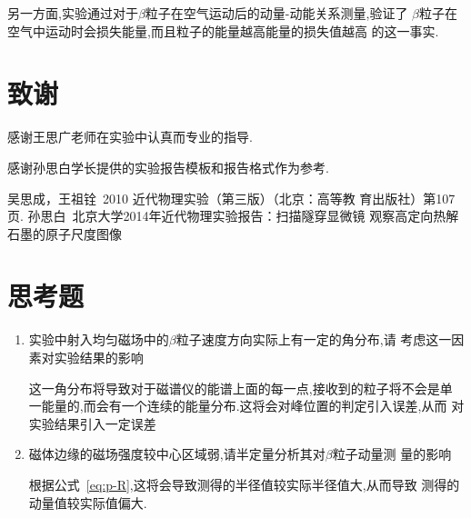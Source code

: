 \documentclass[aps,pre,12pt,preprint,onecolumn,showpacs,showkeys]{revtex4-1}
\begin{document}
另一方面,实验通过对于$\beta$粒子在空气运动后的动量-动能关系测量,验证了
$\beta$粒子在空气中运动时会损失能量,而且粒子的能量越高能量的损失值越高
的这一事实.

\section{致谢}

感谢王思广老师在实验中认真而专业的指导.

感谢孙思白学长提供的实验报告模板和报告格式作为参考.

\begin{thebibliography}{}
 吴思成，王祖铨~2010 近代物理实验（第三版）（北京：高等教
育出版社）第107页.  %
 孙思白~北京大学2014年近代物理实验报告：扫描隧穿显微镜
  观察高定向热解石墨的原子尺度图像
\end{thebibliography}

\clearpage
\appendix
\section{思考题}

\begin{enumerate}
\item 实验中射入均匀磁场中的$\beta$粒子速度方向实际上有一定的角分布,请
  考虑这一因素对实验结果的影响

  这一角分布将导致对于磁谱仪的能谱上面的每一点,接收到的粒子将不会是单
  一能量的,而会有一个连续的能量分布.这将会对峰位置的判定引入误差,从而
  对实验结果引入一定误差

\item 磁体边缘的磁场强度较中心区域弱,请半定量分析其对$\beta$粒子动量测
  量的影响

  根据公式~\ref{eq:p-R},这将会导致测得的半径值较实际半径值大,从而导致
  测得的动量值较实际值偏大.
\end{enumerate}
\end{document}
